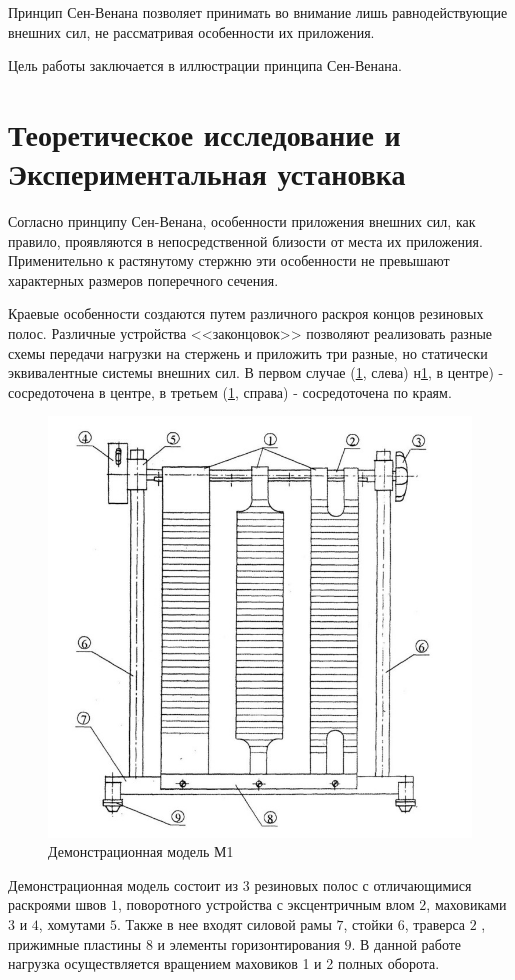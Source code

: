 \documentclass[12pt, a4paper]{article}
\begin{document}
 Принцип Сен-Венана позволяет принимать во внимание лишь равнодействующие внешних сил, не рассматривая особенности их приложения.
	
	Цель работы заключается в иллюстрации принципа Сен-Венана.
    
    \newpage
    \section{Теоретическое исследование и Экспериментальная установка}
    Согласно принципу Сен-Венана, особенности приложения внешних сил, как правило, проявляются в непосредственной близости от места их приложения. Применительно к растянутому стержню эти особенности не превышают характерных размеров поперечного сечения.
    
	Краевые особенности создаются путем различного раскроя концов резиновых полос. Различные устройства <<законцовок>>  позволяют реализовать разные схемы передачи нагрузки на стержень и приложить три разные, но статически эквивалентные системы внешних сил. В первом случае (\ref{rezinochki}, слева) н\ref{rezinochki}, в центре) - сосредоточена в центре, в третьем (\ref{rezinochki}, справа) - сосредоточена по краям.
    
    \begin{figure}[h]
\centering
\includegraphics[width = 15cm]{modelka.jpg}
\caption{Демонстрационная модель М1}
\label{rezinochki}
\end{figure}
	Демонстрационная модель состоит из 3 резиновых полос с отличающимися раскроями швов $1$, поворотного устройства с эксцентричным влом $2$, маховиками $3$ и $4$, хомутами $5$. Также в нее входят силовой рамы $7$, стойки $6$, траверса $2$ , прижимные пластины $8$ и элементы горизонтирования $9$.
	В данной работе нагрузка осуществляется вращением маховиков 1 и 2 полных оборота.
    \newpage
\end{document}
